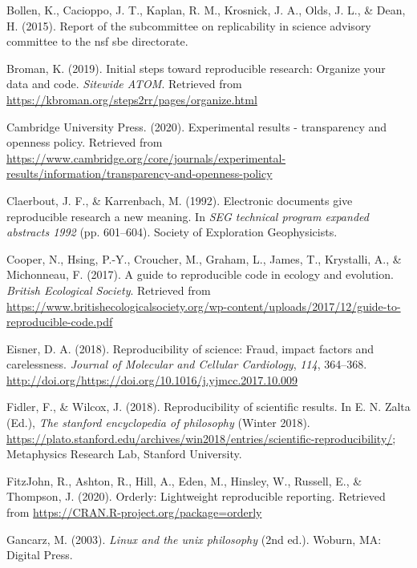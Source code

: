 \documentclass[12pt,twoside]{reedthesis}
\begin{document}
\hypertarget{ref-arlington}{}
Bollen, K., Cacioppo, J. T., Kaplan, R. M., Krosnick, J. A., Olds, J.
L., \& Dean, H. (2015). Report of the subcommittee on replicability in
science advisory committee to the nsf sbe directorate.

\hypertarget{ref-broman}{}
Broman, K. (2019). Initial steps toward reproducible research: Organize
your data and code. \emph{Sitewide ATOM}. Retrieved from
\url{https://kbroman.org/steps2rr/pages/organize.html}

\hypertarget{ref-exp-results}{}
Cambridge University Press. (2020). Experimental results - transparency
and openness policy. Retrieved from
\url{https://www.cambridge.org/core/journals/experimental-results/information/transparency-and-openness-policy}

\hypertarget{ref-claerbout}{}
Claerbout, J. F., \& Karrenbach, M. (1992). Electronic documents give
reproducible research a new meaning. In \emph{SEG technical program
expanded abstracts 1992} (pp. 601--604). Society of Exploration
Geophysicists.

\hypertarget{ref-cooper2017guide}{}
Cooper, N., Hsing, P.-Y., Croucher, M., Graham, L., James, T.,
Krystalli, A., \& Michonneau, F. (2017). A guide to reproducible code in
ecology and evolution. \emph{British Ecological Society}. Retrieved from
\url{https://www.britishecologicalsociety.org/wp-content/uploads/2017/12/guide-to-reproducible-code.pdf}

\hypertarget{ref-eisner-reproducibility}{}
Eisner, D. A. (2018). Reproducibility of science: Fraud, impact factors
and carelessness. \emph{Journal of Molecular and Cellular Cardiology},
\emph{114}, 364--368.
\url{http://doi.org/https://doi.org/10.1016/j.yjmcc.2017.10.009}

\hypertarget{ref-sep-scientific-reproducibility}{}
Fidler, F., \& Wilcox, J. (2018). Reproducibility of scientific results.
In E. N. Zalta (Ed.), \emph{The stanford encyclopedia of philosophy}
(Winter 2018).
\url{https://plato.stanford.edu/archives/win2018/entries/scientific-reproducibility/};
Metaphysics Research Lab, Stanford University.

\hypertarget{ref-R-orderly}{}
FitzJohn, R., Ashton, R., Hill, A., Eden, M., Hinsley, W., Russell, E.,
\& Thompson, J. (2020). Orderly: Lightweight reproducible reporting.
Retrieved from \url{https://CRAN.R-project.org/package=orderly}

\hypertarget{ref-unix}{}
Gancarz, M. (2003). \emph{Linux and the unix philosophy} (2nd ed.).
Woburn, MA: Digital Press.
\end{document}

